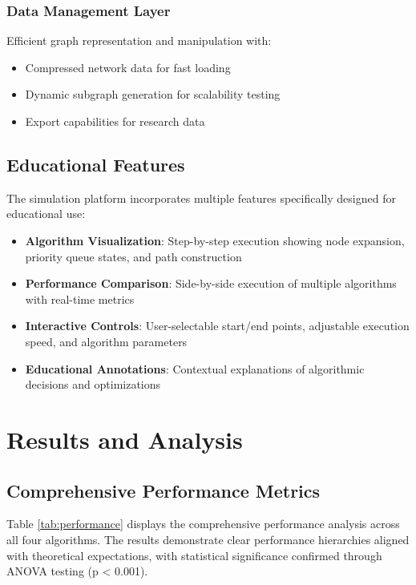 \documentclass[conference]{IEEEtran}
\begin{document}
\subsubsection{Data Management Layer}
Efficient graph representation and manipulation with:
\begin{itemize}
\item Compressed network data for fast loading
\item Dynamic subgraph generation for scalability testing
\item Export capabilities for research data
\end{itemize}

\subsection{Educational Features}

The simulation platform incorporates multiple features specifically designed for educational use:

\begin{itemize}
\item \textbf{Algorithm Visualization}: Step-by-step execution showing node expansion, priority queue states, and path construction
\item \textbf{Performance Comparison}: Side-by-side execution of multiple algorithms with real-time metrics
\item \textbf{Interactive Controls}: User-selectable start/end points, adjustable execution speed, and algorithm parameters
\item \textbf{Educational Annotations}: Contextual explanations of algorithmic decisions and optimizations
\end{itemize}

\section{Results and Analysis}

\subsection{Comprehensive Performance Metrics}

Table \ref{tab:performance} displays the comprehensive performance analysis across all four algorithms. The results demonstrate clear performance hierarchies aligned with theoretical expectations, with statistical significance confirmed through ANOVA testing (p < 0.001).
\end{document}
